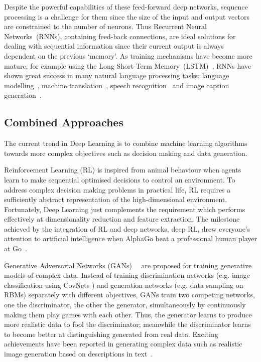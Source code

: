 Despite the powerful capabilities of these feed-forward deep networks, sequence processing is a challenge for them since the size of the input and output vectors are constrained to the number of neurons.
Thus Recurrent Neural Networks~(RNNs), containing feed-back connections, are ideal solutions for dealing with sequential information since their current output is always dependent on the previous `memory'.
As training mechanisms have become more mature, for example using the Long Short-Term Memory~(LSTM)~\citep{hochreiter1997long}, RNNs have shown great success in many natural language processing tasks: language modelling~\citep{mikolov2010recurrent}, machine translation~\citep{sutskever2014sequence}, speech recognition~\citep{graves2014towards} and image caption generation~\citep{karpathy2015deep}.

\subsection{Combined Approaches}
The current trend in Deep Learning is to combine machine learning algorithms towards more complex objectives such as \DIFaddbegin {}\DIFaddend decision making and data generation.

Reinforcement Learning (RL) is inspired from animal behaviour when agents learn to make sequential optimised decisions to control an environment.
To address complex decision making problems in practical life, RL requires a sufficiently abstract representation of the high-dimensional environment.
Fortunately, Deep Learning just complements the requirement which performs effectively at dimensionality reduction and feature extraction.
The milestone achieved by the integration of RL and deep networks, deep RL, drew everyone's attention to artificial intelligence when AlphaGo beat a professional human player at Go~\citep{silver2016mastering}.

Generative Adversarial Networks (GANs)~~\citep{goodfellow2014generative} are proposed for training generative models of complex data.
Instead of training discrimination networks (e.g. image classification using CovNets ) and generation networks (e.g. data sampling on RBMs) separately with different objectives, GANs train two competing networks, one the discriminator, the other the generator, simultaneously by continuously making them play games with each other.
Thus, the generator learns to produce more realistic data to fool the discriminator; meanwhile the discriminator learns to become better at distinguishing generated from real data.
Exciting achievements have been reported in generating complex data such as realistic image generation based on descriptions in text~\citep{radford2015unsupervised}.

